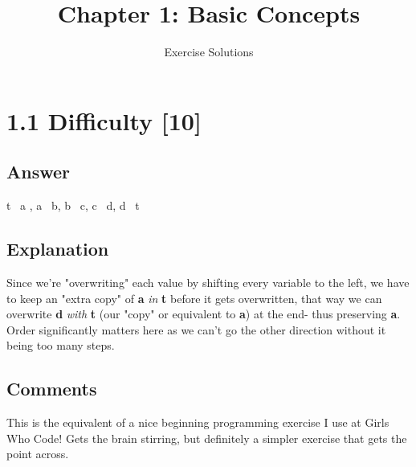 \documentclass{article}
\title{Chapter 1: Basic Concepts}
\author{Exercise Solutions}
\date{}
\begin{document}
\maketitle

\section*{1.1 Difficulty [10]}

\subsection*{Answer}
t \textleftarrow\ a , a \textleftarrow\ b, b \textleftarrow\ c, 
c \textleftarrow\ d, d \textleftarrow\ t
\subsection*{Explanation}
Since we're "overwriting" each value by shifting every variable to the left, 
we have to keep an "extra copy" of \textbf{a} \textit{in} \textbf{t} before it gets overwritten, that way we can
overwrite \textbf{d} \textit{with} \textbf{t} (our "copy" or equivalent to \textbf{a}) at the end- thus
preserving \textbf{a}. Order significantly matters here as we can't go the other direction
 without it being too many steps.
\subsection*{Comments}
This is the equivalent of a nice beginning programming exercise I use
at Girls Who Code! Gets the brain stirring, but definitely a simpler 
exercise that gets the point across.
\end{document}
